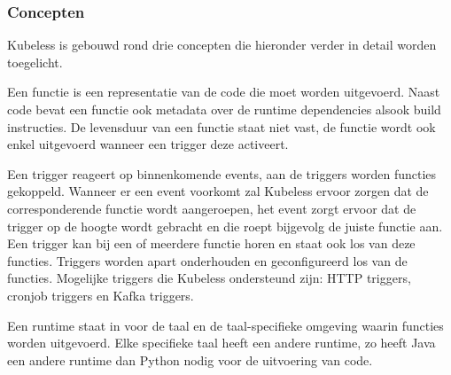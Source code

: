 \subsubsection{Concepten}
Kubeless is gebouwd rond drie concepten die hieronder verder in detail worden toegelicht.
\begin{description}[style=unboxed, labelwidth=\linewidth, listparindent =0pt]
    \item[Functies]
    Een functie is een representatie van de code die moet worden uitgevoerd. Naast code bevat een functie ook metadata over de runtime dependencies alsook build instructies. De levensduur van een functie staat niet vast, de functie wordt ook enkel uitgevoerd wanneer een trigger deze activeert. \autocite{KnightXun2018}
    \newline
    
    \item[Triggers]
    Een trigger reageert op binnenkomende  events, aan de triggers worden functies gekoppeld. Wanneer er een event voorkomt zal Kubeless ervoor zorgen dat de corresponderende functie wordt aangeroepen, het event zorgt ervoor dat de trigger op de hoogte wordt gebracht en die roept bijgevolg de juiste functie aan. Een trigger kan bij een of meerdere functie horen en staat ook los van deze functies. Triggers worden apart onderhouden en geconfigureerd los van de functies. Mogelijke triggers die Kubeless ondersteund zijn: HTTP triggers, cronjob triggers en Kafka triggers.\autocite{KnightXun2018}
    \newline
    
    \item[Runtime]
    Een runtime staat in voor de taal en de taal-specifieke omgeving waarin functies worden uitgevoerd. Elke specifieke taal heeft een andere runtime, zo heeft Java een andere runtime dan Python nodig voor de uitvoering van code. \autocite{KnightXun2018}
    \newline
\end{description}

